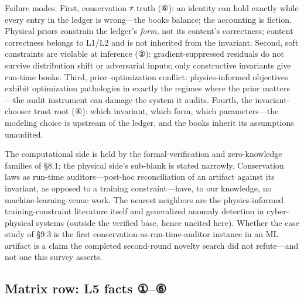 \documentclass[11pt,a4paper]{article}
\begin{document}
Failure modes. First, conservation ≠ truth (⑥): an identity can hold exactly while every entry in the ledger is wrong—the books balance; the accounting is fiction. Physical priors constrain the ledger's \textit{form}, not its content's correctness; content correctness belongs to L1/L2 and is not inherited from the invariant. Second, soft constraints are violable at inference (②): gradient-suppressed residuals do not survive distribution shift or adversarial inputs; only constructive invariants give run-time books. Third, prior–optimization conflict: physics-informed objectives exhibit optimization pathologies in exactly the regimes where the prior matters \cite{key13}—the audit instrument can damage the system it audits. Fourth, the invariant-chooser trust root (④): which invariant, which form, which parameters—the modeling choice is upstream of the ledger, and the books inherit its assumptions unaudited.

The computational side is held by the formal-verification and zero-knowledge families of §8.1; the physical side's sub-blank is stated narrowly. Conservation laws as run-time auditors—post-hoc reconciliation of an artifact against its invariant, as opposed to a training constraint—have, to our knowledge, no machine-learning-venue work. The nearest neighbors are the physics-informed training-constraint literature itself \cite{key12,key13} and generalized anomaly detection in cyber-physical systems (outside the verified base, hence uncited here). Whether the case study of §9.3 is the first conservation-as-run-time-auditor instance in an ML artifact is a claim the completed second-round novelty search did not refute—and not one this survey asserts.

\subsection{Matrix row: L5 facts ①–⑥}
\end{document}
